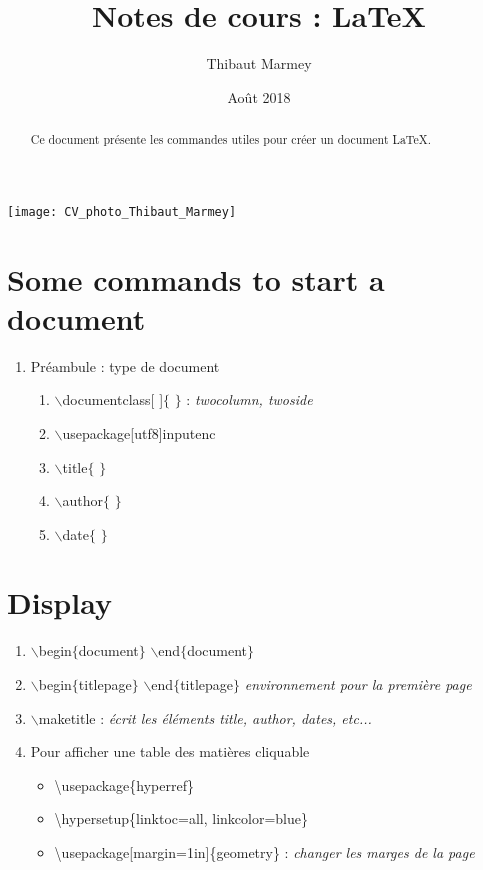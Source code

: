 \documentclass[12pt, letterpaper]{article}
\title{Notes de cours : \LaTeX}
\author{Thibaut Marmey}
\date{Août 2018}
\begin{document}
\maketitle
\begin{center}
\texttt{[image: CV\_photo\_Thibaut\_Marmey]}
\end{center}
\vspace{0.25cm}
\renewcommand{\abstractname}{Résumé}
\begin{abstract}
Ce document présente les commandes utiles pour créer un document \LaTeX.
\end{abstract}

\tableofcontents

\newpage
\section{Some commands to start a document}
\begin{enumerate}
\item Préambule : type de document
\begin{enumerate}
\item $\backslash$documentclass[ ]$\lbrace$ $\rbrace$ : \textit{twocolumn, twoside}
\item $\backslash$usepackage[utf8]{inputenc}
\item $\backslash$title$\lbrace$ $\rbrace$
\item $\backslash$author$\lbrace$ $\rbrace$
\item $\backslash$date$\lbrace$ $\rbrace$
\end{enumerate}
\end{enumerate}

\section{Display}
\begin{enumerate}
\item $\backslash$begin$\lbrace$document$\rbrace$  $\backslash$end$\lbrace$document$\rbrace$
\item $\backslash$begin$\lbrace$titlepage$\rbrace$  $\backslash$end$\lbrace$titlepage$\rbrace$ \textit{environnement pour la première page}
\item $\backslash$maketitle : \textit{écrit les éléments title, author, dates, etc...}
\item Pour afficher une table des matières cliquable
\begin{itemize}
\item \textbackslash usepackage\{hyperref\}
\item \textbackslash hypersetup\{linktoc=all, linkcolor=blue\}
\item \textbackslash usepackage[margin=1in]\{geometry\} : \textit{changer les marges de la page}
\end{itemize}
\end{enumerate}
\end{document}

